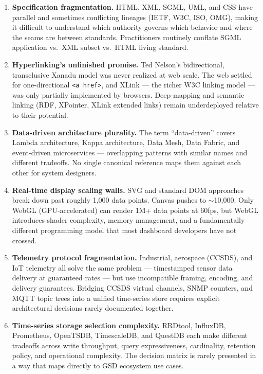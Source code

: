 \documentclass[11pt,letterpaper]{article}
\begin{document}
\begin{enumerate}
  \item \textbf{Specification fragmentation.} HTML, XML, SGML, UML, and CSS have parallel and sometimes conflicting lineages (IETF, W3C, ISO, OMG), making it difficult to understand which authority governs which behavior and where the seams are between standards. Practitioners routinely conflate SGML application vs.\ XML subset vs.\ HTML living standard.
  \item \textbf{Hyperlinking's unfinished promise.} Ted Nelson's bidirectional, transclusive Xanadu model was never realized at web scale. The web settled for one-directional \texttt{<a href>}, and XLink --- the richer W3C linking model --- was only partially implemented by browsers. Deep-mapping and semantic linking (RDF, XPointer, XLink extended links) remain underdeployed relative to their potential.
  \item \textbf{Data-driven architecture plurality.} The term ``data-driven'' covers Lambda architecture, Kappa architecture, Data Mesh, Data Fabric, and event-driven microservices --- overlapping patterns with similar names and different tradeoffs. No single canonical reference maps them against each other for system designers.
  \item \textbf{Real-time display scaling walls.} SVG and standard DOM approaches break down past roughly 1,000 data points. Canvas pushes to $\sim$10,000. Only WebGL (GPU-accelerated) can render 1M+ data points at 60fps, but WebGL introduces shader complexity, memory management, and a fundamentally different programming model that most dashboard developers have not crossed.
  \item \textbf{Telemetry protocol fragmentation.} Industrial, aerospace (CCSDS), and IoT telemetry all solve the same problem --- timestamped sensor data delivery at guaranteed rates --- but use incompatible framing, encoding, and delivery guarantees. Bridging CCSDS virtual channels, SNMP counters, and MQTT topic trees into a unified time-series store requires explicit architectural decisions rarely documented together.
  \item \textbf{Time-series storage selection complexity.} RRDtool, InfluxDB, Prometheus, OpenTSDB, TimescaleDB, and QuestDB each make different tradeoffs across write throughput, query expressiveness, cardinality, retention policy, and operational complexity. The decision matrix is rarely presented in a way that maps directly to GSD ecosystem use cases.
\end{enumerate}
\end{document}
